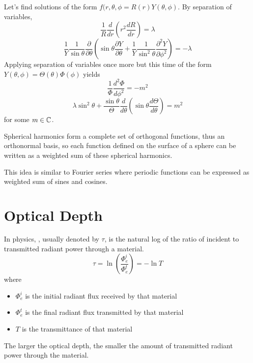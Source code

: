 \documentclass[12pt]{scrartcl}
\begin{document}
\begin{lemma}
    Let's find solutions of the form $f(r, \theta, \phi = R(r)Y(\theta, \phi)$. By separation of variables,
    \[\frac{1}{R}\frac{d}{dr}(r^2\frac{dR}{dr}) = \lambda\]
    \[\frac{1}{Y}\frac{1}{\sin\theta}\frac{\partial}{\partial \theta}(\sin \theta \frac{\partial Y}{\partial \theta} + \frac{1}{Y}\frac{1}{\sin^2\theta}\frac{\partial^2 Y}{\partial \phi^2}) = -\lambda\]
    Applying separation of variables once more but this time of the form $Y(\theta,
        \phi) = \Theta(\theta)\Phi(\phi)$ yields
    \[\frac{1}{\Phi}\frac{d^2\Phi}{d\phi^2} = -m^2\]
    \[\lambda\sin^2\theta + \frac{\sin \theta}{\Theta}\frac{d}{d\theta}(\sin \theta \frac{d\Theta}{d\theta}) = m^2\]
    for some $m \in \mathbb C$.
\end{lemma}

\begin{note}
    Spherical harmonics form a complete set of orthogonal functions, thus an orthonormal basis, so each function defined on the surface of a sphere can be written as a weighted sum of these spherical harmonics.
\end{note}

\begin{note}
    This idea is similar to Fourier series where periodic functions can be expressed as weighted sum of sines and cosines.
\end{note}

\section{Optical Depth}

\begin{definition}
    In physics, , usually denoted by $\tau$, is the natural log of the ratio of incident to transmitted radiant power through a material.
    \[\tau = \ln\left(\frac{\Phi^i_e}{\Phi^t_e}\right) = -\ln T\]
    where
    \begin{itemize}
        \item $\Phi_e^i$ is the initial radiant flux received by that material
        \item $\Phi_e^t$ is the final radiant flux transmitted by that material
        \item $T$ is the transmittance of that material
    \end{itemize}
\end{definition}

\begin{note}
    The larger the optical depth, the smaller the amount of transmitted radiant power through the material.
\end{note}
\end{document}
